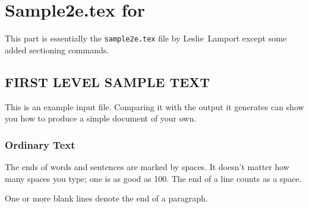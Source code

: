 
\part{Sample2e.tex for \LaTeXe}

This part is essentially the \texttt{sample2e.tex} file by Leslie~Lamport
except some added sectioning commands.

\newcommand{\ip}[2]{(#1, #2)}


\chapter{FIRST LEVEL SAMPLE TEXT}

This is an example input file.	Comparing it with
the output it generates can show you how to
produce a simple document of your own.

\section{Ordinary Text}

The ends  of words and sentences are marked
  by   spaces. It  doesn't matter how many
spaces	  you type; one is as good as 100.  The
end of	 a line counts as a space.

One   or more	blank lines denote the	end
of  a paragraph.

